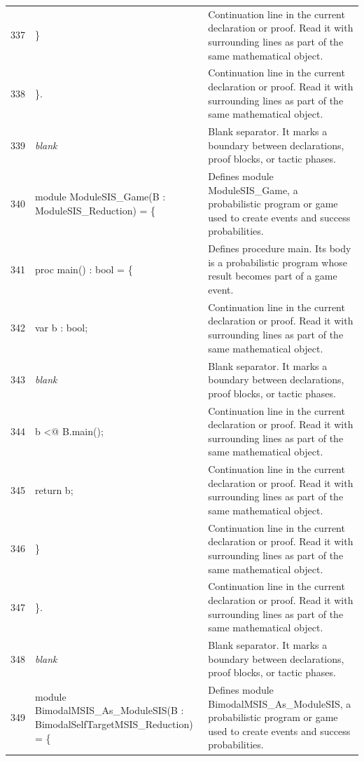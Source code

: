 \documentclass[10pt]{article}
\begin{document}
\begin{longtable}{r L{0.53\textwidth} L{0.37\textwidth}}
337 & {\ttfamily\scriptsize   \}} & Continuation line in the current declaration or proof.  Read it with surrounding lines as part of the same mathematical object. \\
338 & {\ttfamily\scriptsize \}.} & Continuation line in the current declaration or proof.  Read it with surrounding lines as part of the same mathematical object. \\
339 & {\ttfamily\scriptsize \emph{blank}} & Blank separator.  It marks a boundary between declarations, proof blocks, or tactic phases. \\
340 & {\ttfamily\scriptsize module ModuleSIS\_Game(B : ModuleSIS\_Reduction) = \{} & Defines module ModuleSIS\_Game, a probabilistic program or game used to create events and success probabilities. \\
341 & {\ttfamily\scriptsize   proc main() : bool = \{} & Defines procedure main.  Its body is a probabilistic program whose result becomes part of a game event. \\
342 & {\ttfamily\scriptsize     var b : bool;} & Continuation line in the current declaration or proof.  Read it with surrounding lines as part of the same mathematical object. \\
343 & {\ttfamily\scriptsize \emph{blank}} & Blank separator.  It marks a boundary between declarations, proof blocks, or tactic phases. \\
344 & {\ttfamily\scriptsize     b <@ B.main();} & Continuation line in the current declaration or proof.  Read it with surrounding lines as part of the same mathematical object. \\
345 & {\ttfamily\scriptsize     return b;} & Continuation line in the current declaration or proof.  Read it with surrounding lines as part of the same mathematical object. \\
346 & {\ttfamily\scriptsize   \}} & Continuation line in the current declaration or proof.  Read it with surrounding lines as part of the same mathematical object. \\
347 & {\ttfamily\scriptsize \}.} & Continuation line in the current declaration or proof.  Read it with surrounding lines as part of the same mathematical object. \\
348 & {\ttfamily\scriptsize \emph{blank}} & Blank separator.  It marks a boundary between declarations, proof blocks, or tactic phases. \\
349 & {\ttfamily\scriptsize module BimodalMSIS\_As\_ModuleSIS(B : BimodalSelfTargetMSIS\_Reduction) = \{} & Defines module BimodalMSIS\_As\_ModuleSIS, a probabilistic program or game used to create events and success probabilities. \\

\end{longtable}
\end{document}
